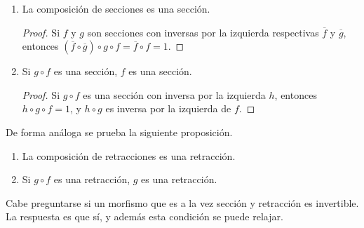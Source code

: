 \begin{proposition}\;
  \begin{enumerate}
  \item La composición de secciones es una sección.
    \begin{proof}
      Si $f$ y $g$ son secciones con inversas por la izquierda respectivas
      $\overline f$ y $\overline g$, entonces
      $(\overline f\circ\overline g)\circ g\circ f=\overline f\circ f=1$.
    \end{proof}
  \item Si $g\circ f$ es una sección, $f$ es una sección.
    \begin{proof}
      Si $g\circ f$ es una sección con inversa por la izquierda $h$, entonces
      $h\circ g\circ f=1$, y $h\circ g$ es inversa por la izquierda de $f$.
    \end{proof}
  \end{enumerate}
\end{proposition}

De forma análoga se prueba la siguiente proposición.

\begin{proposition}\;
  \begin{enumerate}
  \item La composición de retracciones es una retracción.
  \item Si $g\circ f$ es una retracción, $g$ es una retracción.
  \end{enumerate}
\end{proposition}

Cabe preguntarse si un morfismo que es a la vez sección y retracción es
invertible. La respuesta es que sí, y además esta condición se puede relajar.

